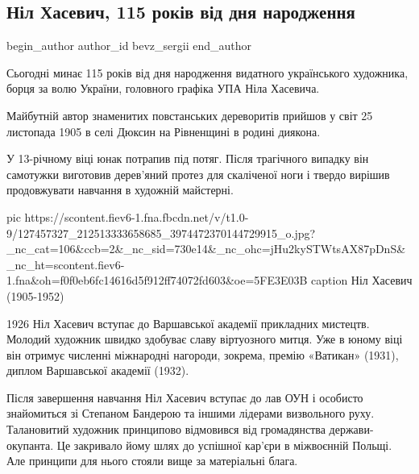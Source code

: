  
 
 
 
 
 
\subsection{Ніл Хасевич, 115 років від дня народження}
\label{sec:25_11_2020.fb.bevz_sergii.2.nil_nasevich_115_rokiv}
\ifcmt
	begin_author
   author_id bevz_sergii
	end_author
\fi
{}

Сьогодні минає 115 років від дня народження видатного українського художника,
борця за волю України, головного графіка УПА Ніла Хасевича.

Майбутній автор знаменитих повстанських дереворитів прийшов у світ 25 листопада
1905 в селі Дюксин на Рівненщині в родині диякона. 

У 13-річному віці юнак потрапив під потяг. Після трагічного випадку він
самотужки виготовив дерев’яний протез для скаліченої ноги і твердо вирішив
продовжувати навчання в художній майстерні. 

\ifcmt
pic https://scontent.fiev6-1.fna.fbcdn.net/v/t1.0-9/127457327_212513333658685_3974472370144729915_o.jpg?_nc_cat=106&ccb=2&_nc_sid=730e14&_nc_ohc=jHu2kySTWtsAX87pDnS&_nc_ht=scontent.fiev6-1.fna&oh=f0f0eb6fc14616d5f912ff74072fd603&oe=5FE3E03B
caption Ніл Хасевич (1905-1952)
\fi

1926 Ніл Хасевич вступає до Варшавської академії прикладних мистецтв. Молодий
художник швидко здобуває славу віртуозного митця. Уже в юному віці він отримує
численні міжнародні нагороди, зокрема, премію «Ватикан» (1931), диплом
Варшавської академії (1932).

Після завершення навчання Ніл Хасевич вступає до лав ОУН і особисто знайомиться
зі Степаном Бандерою та іншими лідерами визвольного руху. Талановитий художник
принципово відмовився від громадянства держави-окупанта. Це закривало йому шлях
до успішної кар’єри в міжвоєнній Польщі. Але принципи для нього стояли вище за
матеріальні блага.

